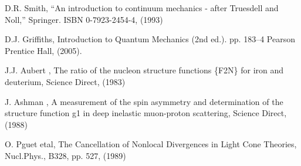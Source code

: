 

         D.R. Smith, ``An introduction to continuum mechanics - after Truesdell and Noll,''
         Springer. ISBN 0-7923-2454-4, (1993)


         D.J. Griffiths, Introduction to Quantum Mechanics (2nd ed.). pp. 183–4 
         Pearson Prentice Hall, (2005).


         J.J. Aubert \etal, The ratio of the nucleon structure functions \{F2N\} for iron and deuterium,
         Science Direct, (1983)        

        J. Ashman \etal, A measurement of the spin asymmetry and determination of the structure function g1 in deep inelastic muon-proton scattering,
        Science Direct, (1988)   


        O. Pguet etal, The Cancellation of Nonlocal Divergences in Light Cone Theories,
        Nucl.Phys., B328, pp. 527, (1989)

